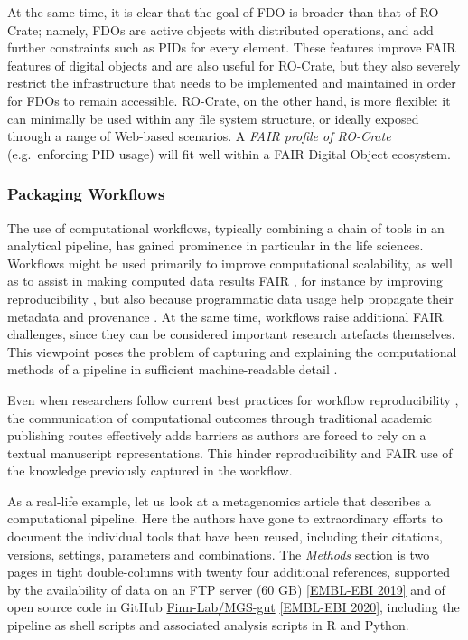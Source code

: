{At the same time, it is clear that the goal of FDO is broader than that
of RO-Crate; namely, FDOs are active objects with distributed
operations, and add further constraints such as PIDs for every element.
These features improve FAIR features of digital objects and are also
useful for RO-Crate, but they also severely restrict the infrastructure
that needs to be implemented and maintained in order for FDOs to remain
accessible. RO-Crate, on the other hand, is more flexible: it can
minimally be used within any file system structure, or ideally exposed
through a range of Web-based scenarios. A \emph{FAIR profile of
RO-Crate} (e.g.~enforcing PID usage) will fit well within a FAIR Digital
Object ecosystem.

\hypertarget{packaging-workflows}{%
\subsubsection{Packaging Workflows}\label{packaging-workflows}}

The use of computational workflows, typically combining a chain of tools
in an analytical pipeline, has gained prominence in particular in the
life sciences. Workflows might be used primarily to improve
computational scalability, as well as to assist in making computed data
results FAIR \cite{ch5-55}, for
instance by improving reproducibility
\cite{Cohen-Boulakia 2017}, but also
because programmatic data usage help propagate their metadata and
provenance \cite{ch5-69}. At the
same time, workflows raise additional FAIR challenges, since they can be
considered important research artefacts themselves. This viewpoint poses
the problem of capturing and explaining the computational methods of a
pipeline in sufficient machine-readable detail
\cite{ch5-80}.

Even when researchers follow current best practices for workflow
reproducibility
\cite{ch5-60}
\cite{Cohen-Boulakia 2017}, the
communication of computational outcomes through traditional academic
publishing routes effectively adds barriers as authors are forced to
rely on a textual manuscript representations. This hinder
reproducibility and FAIR use of the knowledge previously captured in the
workflow.

As a real-life example, let us look at a metagenomics article
\cite{Almeida 2019} that describes
a computational pipeline. Here the authors have gone to extraordinary
efforts to document the individual tools that have been reused,
including their citations, versions, settings, parameters and
combinations. The \emph{Methods} section is two pages in tight
double-columns with twenty four additional references, supported by the
availability of data on an FTP server (60 GB)
\href{http://ftp.ebi.ac.uk/pub/databases/metagenomics/umgs_analyses/}{{[}EMBL-EBI 2019{]}}
and of open source code in GitHub
\href{https://github.com/Finn-Lab/MGS-gut}{Finn-Lab/MGS-gut}
\href{https://github.com/Finn-Lab/MGS-gut}{{[}EMBL-EBI 2020{]}}, including the
pipeline as shell scripts and associated analysis scripts in R and
Python.

}
